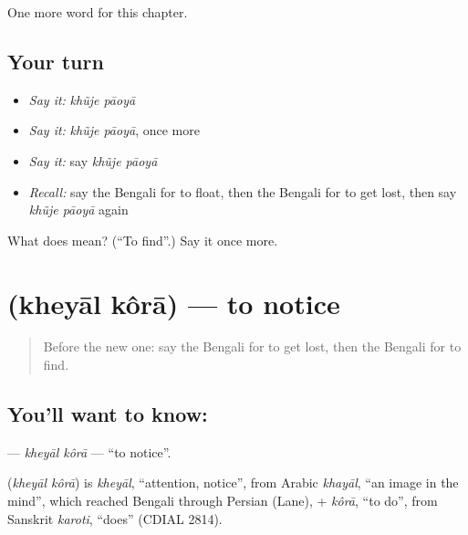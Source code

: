 \begin{grammarlens}[title={What you've built}]
One more word for this chapter.
\end{grammarlens}

\subsection*{Your turn}
\begin{itemize}
\raggedright
  \item \emph{Say it:} \emph{khũje pāoyā}
  \item \emph{Say it:} \emph{khũje pāoyā}, once more
  \item \emph{Say it:} say \emph{khũje pāoyā}
  \item \emph{Recall:} say the Bengali for to float, then the Bengali for to get lost, then say \emph{khũje pāoyā} again
\end{itemize}

\begin{tcolorbox}[breakable,colback=teal!4,colframe=teal!35!black,title={Before you move on}]
What does   mean? (\textquotedblleft{}To find\textquotedblright{}.) Say it once more.
\end{tcolorbox}
\section[\texorpdfstring{\bn{খেয়াল} \bn{করা} (kheyāl kôrā)}{খেয়াল করা (kheyāl kôrā)}]{  (kheyāl kôrā) — to notice}

\label{lesson:BN-C241-kheyal-kora}



\begin{quote}
Before the new one: say the Bengali for to get lost, then the Bengali for to find.
\end{quote}

\subsection*{You'll want to know:  }
\textbf{ } — \emph{kheyāl kôrā} — \textquotedblleft{}to notice\textquotedblright{}.

\begin{cousinweb}
\textbf{ } (\emph{kheyāl kôrā}) is \emph{kheyāl}, \textquotedblleft{}attention, notice\textquotedblright{}, from Arabic \emph{khayāl}, \textquotedblleft{}an image in the mind\textquotedblright{}, which reached Bengali through Persian (Lane), + \emph{kôrā}, \textquotedblleft{}to do\textquotedblright{}, from Sanskrit \emph{karoti}, \textquotedblleft{}does\textquotedblright{} (CDIAL 2814).
\end{cousinweb}


